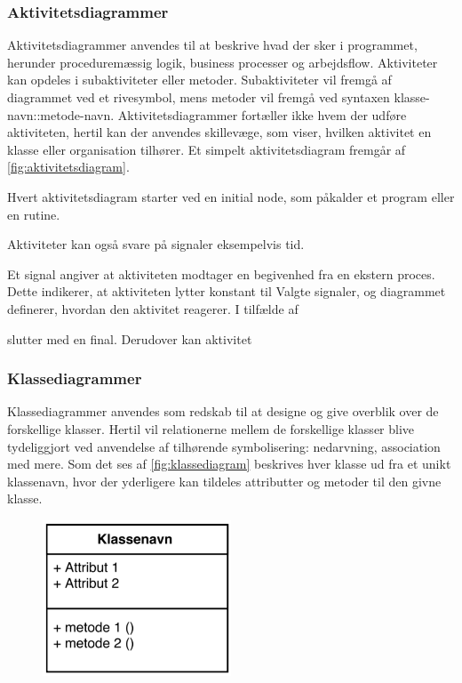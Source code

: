 \subsubsection{Aktivitetsdiagrammer} 
Aktivitetsdiagrammer anvendes til at beskrive hvad der sker i programmet, herunder proceduremæssig logik, business processer og arbejdsflow. Aktiviteter kan opdeles i subaktiviteter eller metoder. Subaktiviteter vil fremgå af diagrammet ved et rivesymbol, mens metoder vil fremgå ved syntaxen klasse-navn::metode-navn. Aktivitetsdiagrammer fortæller ikke hvem der udføre aktiviteten, hertil kan der anvendes skillevæge, som viser, hvilken aktivitet en klasse eller organisation tilhører. Et simpelt aktivitetsdiagram fremgår af \autoref{fig:aktivitetsdiagram}.









 Hvert aktivitetsdiagram starter ved en initial node, som 
påkalder et program eller en rutine.



Aktiviteter kan også svare på signaler eksempelvis tid. 



Et signal angiver
at aktiviteten modtager en begivenhed fra en ekstern proces. Dette indikerer, at
aktiviteten lytter konstant til Valgte signaler, og diagrammet definerer, hvordan den
aktivitet reagerer.
I tilfælde af


slutter med en final. Derudover kan aktivitet 


\subsubsection{Klassediagrammer}
Klassediagrammer anvendes som redskab til at designe og give overblik over de forskellige klasser. Hertil vil relationerne mellem de forskellige klasser blive tydeliggjort ved anvendelse af tilhørende symbolisering: nedarvning, association %
med mere. Som det ses af \autoref{fig:klassediagram} beskrives hver klasse ud fra et unikt klassenavn, hvor der yderligere kan tildeles attributter og metoder til den givne klasse.\cite{Fowler2004} 

\begin{figure} [H]
\centering
\includegraphics[width=0.5\textwidth]{figures/klassediag}
\caption{}
\label{fig:klassediagram}
\end{figure}